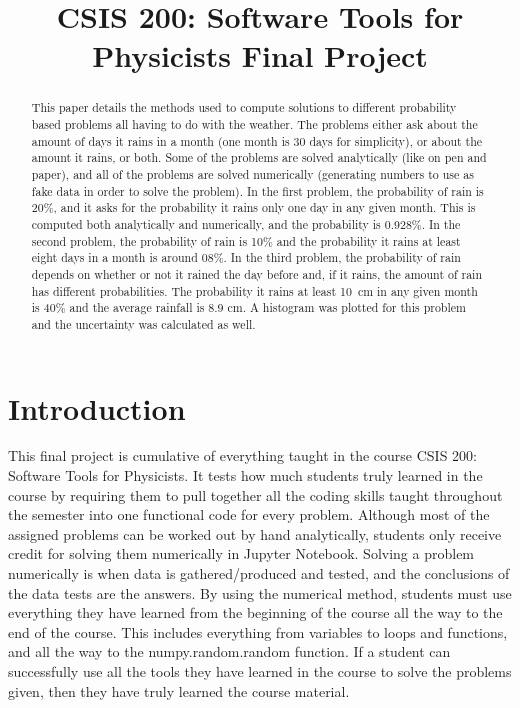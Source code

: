 \documentclass[12pt]{article}
\title{CSIS 200: Software Tools for Physicists Final Project}
\begin{document}
\begin{abstract}

	This paper details the methods used to compute solutions to different probability
	based problems all having to do with the weather. The problems either ask about the 
	amount of days it rains in a month (one month is 30 days for simplicity), or about the 
	amount it rains, 
	or both. Some of the problems are solved analytically (like on pen and paper), and all of 
	the problems are solved numerically (generating numbers to use as fake data in order 
	to solve the problem). In the first problem, the probability of rain is 20\%, and it asks for 
	the probability it rains only one day in any given month. This is computed both 
	analytically and numerically, and the probability is 0.928\%. In the second problem, the 
	probability of rain is 10\% and the probability it rains at least eight days in a month is 
	around 08\%. In the third problem, the probability of rain depends on whether or not
	it rained the day before and, if it rains, the amount of rain has different probabilities. 
	The probability it rains at least 10~cm in any given month is 40\% and the average
	rainfall is 8.9 cm. A histogram was plotted for this problem and the uncertainty was
	calculated as well.

\end{abstract}
\section{Introduction}

	This final project is cumulative of everything taught in the course CSIS 200: 
	Software Tools for Physicists. It tests how much students truly learned in the
	course by requiring them to pull together all the coding skills taught throughout the 
	semester into one functional code for every problem. Although most of the 
	assigned problems can be worked out by hand analytically, students only receive 
	credit for solving them numerically in Jupyter Notebook. Solving a problem numerically
	is when data is gathered/produced and tested, and the conclusions of the data tests
	are the answers. By using the numerical method, students must use everything they 
	have learned from the beginning of the course all the way to the end of the course. This 
	includes everything from variables to loops and functions, and all the way to the 
	numpy.random.random function. If a student can successfully use all the tools they 
	have learned in the course to solve the problems given, then they have truly learned the 
	course material.
\end{document}
